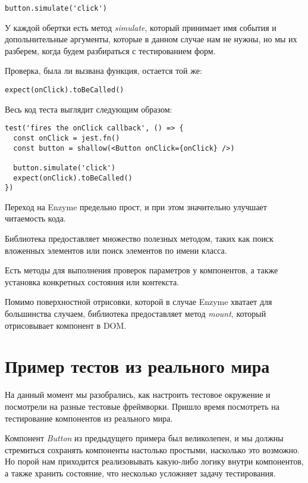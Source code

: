 \begin{lstlisting}
button.simulate('click')
\end{lstlisting}

У каждой обертки есть метод \textit{simulate}, который принимает имя события и допольнительные аргументы, которые в данном случае нам не нужны, но мы их разберем, когда будем разбираться с тестированием форм.

Проверка, была ли вызвана функция, остается той же:

\begin{lstlisting}
expect(onClick).toBeCalled()
\end{lstlisting}

Весь код теста выглядит следующим образом:

\begin{lstlisting}
test('fires the onClick callback', () => {
  const onClick = jest.fn()
  const button = shallow(<Button onClick={onClick} />)
  
  button.simulate('click')
  expect(onClick).toBeCalled()
})
\end{lstlisting}

Переход на Enzyme предельно прост, и при этом значительно улучшает читаемость кода.

Библиотека предоставляет множество полезных методом, таких как поиск вложенных элементов или поиск элементов по имени класса.

Есть методы для выполнения проверок параметров у компонентов, а также установка конкретных состояния или контекста.

Помимо поверхностной отрисовки, которой в случае Enzyme хватает для большинства случаем, библиотека предоставляет метод \textit{mount}, который отрисовывает компонент в DOM.


\section{Пример тестов из реального мира}

На данный момент мы разобрались, как настроить тестовое окружение и посмотрели на разные тестовые фреймворки. Пришло время посмотреть на тестирование компонентов из реального мира.

Компонент \textit{Button} из предыдущего примера был великолепен, и мы должны стремиться сохранять компоненты настолько простыми, насколько это возможно. Но порой нам приходится реализовывать какую-либо логику внутри компонентов, а также хранить состояние, что несколько усложняет задачу тестирования.

